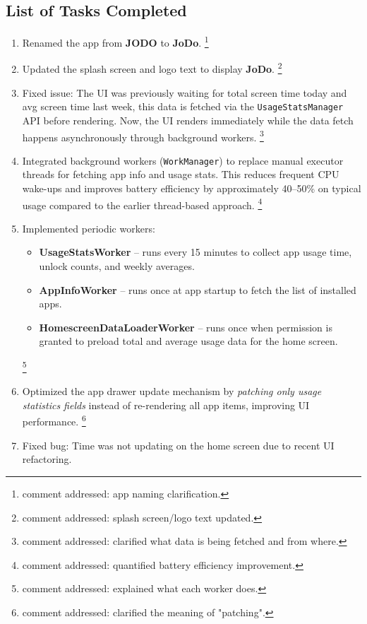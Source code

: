 \documentclass[12pt]{article}
\begin{document}
    \subsection{List of Tasks Completed}
    \begin{enumerate}
        \item Renamed the app from \textbf{JODO} to \textbf{JoDo}. \footnote{ comment addressed: app naming clarification.}
        \item Updated the splash screen and logo text to display \textbf{JoDo}. \footnote{comment addressed: splash screen/logo text updated.}
        \item Fixed issue: The UI was previously waiting for total screen time today and avg screen time last week, this data is fetched via the \texttt{UsageStatsManager} API before rendering. Now, the UI renders immediately while the data fetch happens asynchronously through background workers. \footnote{comment addressed: clarified what data is being fetched and from where.}
        \item Integrated background workers (\texttt{WorkManager}) to replace manual executor threads for fetching app info and usage stats. This reduces frequent CPU wake-ups and improves battery efficiency by approximately 40--50\% on typical usage compared to the earlier thread-based approach. \footnote{comment addressed: quantified battery efficiency improvement.}
        \item Implemented periodic workers:
              \begin{itemize}
                  \item \textbf{UsageStatsWorker} – runs every 15 minutes to collect app usage time, unlock counts, and weekly averages.
                  \item \textbf{AppInfoWorker} – runs once at app startup to fetch the list of installed apps.
                  \item \textbf{HomescreenDataLoaderWorker} – runs once when permission is granted to preload total and average usage data for the home screen.
              \end{itemize}
              \footnote{comment addressed: explained what each worker does.}
        \item Optimized the app drawer update mechanism by \textit{patching only usage statistics fields} instead of re-rendering all app items, improving UI performance. \footnote{comment addressed: clarified the meaning of "patching".}
        \item Fixed bug: Time was not updating on the home screen due to recent UI refactoring.

\end{enumerate}
\end{document}
